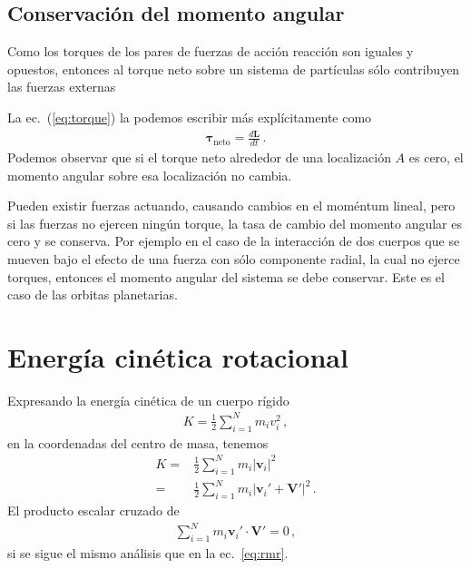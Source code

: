 \subsection{Conservación del momento angular}
Como los torques de los pares de fuerzas de acción reacción son iguales y opuestos, entonces al torque neto sobre un sistema de partículas sólo contribuyen las fuerzas externas

La ec.~(\ref{eq:torque}) la podemos escribir más explícitamente como
\begin{align}
  \label{eq:torqueneto}
  \boldsymbol{\tau}_{\text{neto}}=\frac{d\mathbf{L}}{dt}\,.
\end{align}
Podemos observar que si el torque neto alrededor de una localización
$A$ es cero, el momento angular sobre esa localización no cambia.

Pueden existir fuerzas actuando, causando cambios en el moméntum
lineal, pero si las fuerzas no ejercen ningún torque, la tasa de
cambio del momento angular es cero y se conserva. Por ejemplo en el
caso de la interacción de dos cuerpos que se mueven bajo el efecto de
una fuerza con sólo componente radial, la cual no ejerce torques,
entonces el momento angular del sistema se debe conservar. Este es el
caso de las orbitas planetarias.


\section{Energía cinética rotacional}
Expresando la energía cinética de un cuerpo rígido 
\begin{align}
  K=\frac{1}{2}\sum_{i=1}^N m_i v_i^2\,,
\end{align}
en la coordenadas del centro de masa, tenemos
\begin{align}
  K=&\frac{1}{2}\sum_{i=1}^N m_i |\mathbf{v}_i|^2\nonumber\\
  =&\frac{1}{2}\sum_{i=1}^N m_i |\mathbf{v}_i'+\mathbf{V}'|^2\,.
\end{align}
El producto escalar cruzado de
\begin{align*}
  \sum_{i=1}^N m_i \mathbf{v}_i'\cdot\mathbf{V}'=0\,,
\end{align*}
si se sigue el mismo análisis que en la ec.~\eqref{eq:rmr}.

